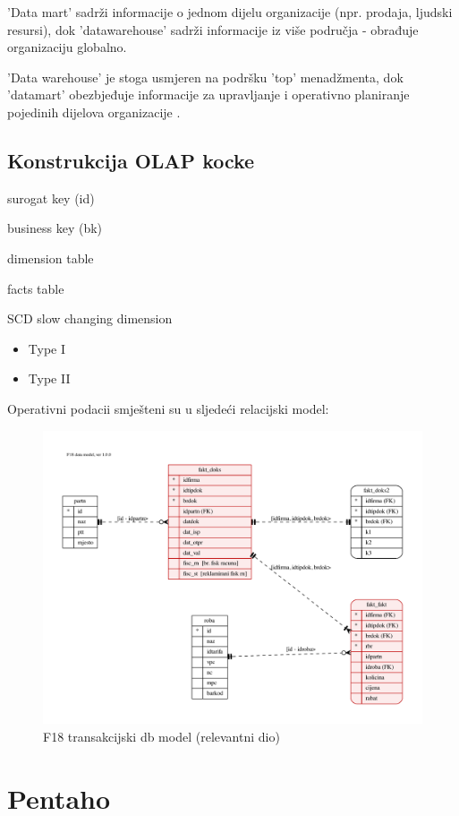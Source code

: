 \documentclass[times, utf8, seminar]{fit}
\begin{document}
'Data mart' sadrži informacije o jednom dijelu organizacije (npr. prodaja, ljudski resursi), dok 'datawarehouse' sadrži informacije iz više područja -  obrađuje organizaciju globalno. 

'Data warehouse' je stoga usmjeren na podršku 'top' menadžmenta, dok 'datamart' obezbjeđuje informacije za upravljanje i operativno planiranje pojedinih dijelova organizacije  \cite[str.~391]{pentaho32}.

\subsection{Konstrukcija OLAP kocke}

surogat key (id)

business key (bk)

dimension table

facts table

SCD slow changing dimension
\begin{itemize}
  \item Type I
  \item Type II
\end{itemize}

Operativni podacii smješteni su u sljedeći relacijski model:

\begin{figure}[H]
\centering
\includegraphics[width=15cm]{img/F18_db.pdf}
\caption{F18 transakcijski db model (relevantni dio)}
\end{figure}


\section{Pentaho}
\end{document}
